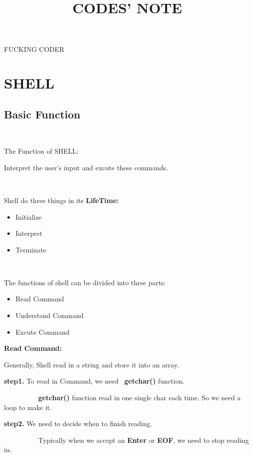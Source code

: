 \documentclass{article}
\begin{document}
\title{CODES' NOTE}

\maketitle

FUCKING CODER

\section{SHELL }

\subsection{Basic Function}

\

The Function of SHELL:

Interpret the user's input and excute these commands.

\

Shell do three things in its {\bfseries{LifeTime:}}
\begin{itemize}
  \item Initialize
  
  \item Interpret
  
  \item Terminate
\end{itemize}


\

The functions of shell can be divided into three parts:
\begin{itemize}
  \item Read Command
  
  \item Understand Command
  
  \item Excute Command
\end{itemize}


{\bfseries{Read Command:}}

Generally, Shell read in a string and store it into an array.

{\bfseries{step1.}} To read in Command, we need \ {\bfseries{getchar()}}
function.

\ \ \ \ \ \ \ \ \ \ {\bfseries{getchar()}} function read in one single char
each time. So we need a loop to make it.

{\bfseries{step2.}} We need to decide when to finish reading.

\ \ \ \ \ \ \ \ \ \ Typically when we accept an {\bfseries{Enter}} or
{\bfseries{EOF}}, we need to stop reading in.
\end{document}
